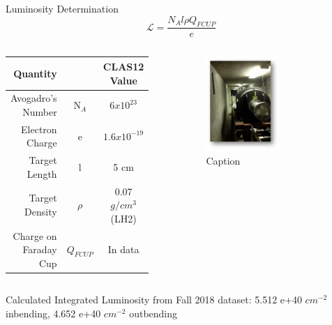 \documentclass[aspectratio=169]{beamer}
\newcommand{\Lumi}{ \mathcal{L}}
\begin{document}
\begin{frame}{ Luminosity Determination}
         \begin{equation*}
                    \Lumi = \frac{N_A l \rho Q_{FCUP}}{e}
        \end{equation*}
        
        \begin{columns}
                                
                \begin{table}
                    \centering
                    \begin{tabular}{rcc}
                        Quantity &  & CLAS12 Value \\\hline
                       Avogadro's Number &  N$_A$  & $6x10^{23}$ \\
                        Electron Charge &e  &  $1.6x10^{-19}$ \\
                        Target Length &l &  5 cm \\
                        Target Density &$\rho$  &  0.07 $g/cm^3$ (LH2) \\
                        Charge on Faraday Cup & $Q_{FCUP}$ &  In data\\
                    \end{tabular}
                    \label{tab:demo}
                \end{table}

                \begin{figure}
                    \centering
                    \includegraphics[width=0.6\textwidth]{defense/beamdump1.png}
                    \caption{Caption}
                    \label{fig:enter-label}
                \end{figure}
            
        \end{columns}
       Calculated Integrated Luminosity from Fall 2018  dataset: 5.512 e+40 $cm^{-2}$ inbending, 4.652 e+40 $cm^{-2}$ outbending
\end{frame}    
\end{document}
